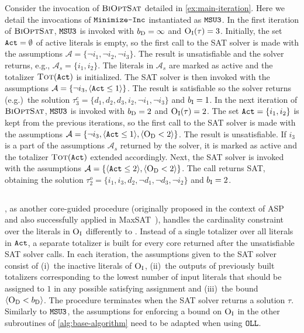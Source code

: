 \begin{example}\label{ex:msu}
Consider the invocation of $\textsc{BiOptSat}$ detailed in \cref{ex:main-iteration}. 
Here we detail the invocations of $\texttt{Minimize-\allowbreak{}Inc}$ instantiated as $\texttt{MSU3}$. 
In the first iteration of $\textsc{BiOptSat}$, $\texttt{MSU3}$ is invoked with $b_{\text{D}} =\infty$ and $\textsc{O}_{\text{I}}(\tau) = 3$.
Initially, the set $\texttt{Act} = \emptyset$ of active literals is empty, so the first call to the SAT solver is made with the assumptions 
$\mathcal{A} =  \{ \lnot i_1, \lnot i_2, \lnot i_3\}$. The result is unsatisfiable and the solver returns, e.g., $\mathcal{A}_s = \{i_1, i_2\}$. 
The literals in $\mathcal{A}_s$ are marked as active and the totalizer $\textsc{Tot}(\texttt{Act})$ is initialized.
The SAT solver is then invoked with the assumptions $\mathcal{A} = \{ \lnot i_3, \langle \texttt{Act} \leq 1 \rangle\}$. 
The result is satisfiable so the solver returns (e.g.)\ the solution $\tau^c_3 = \{ d_1,  d_2, d_3, i_2, \lnot i_1, \lnot i_3\}$ and $b_{\text{I}} = 1$.
In the next iteration of $\textsc{BiOptSat}$, $\texttt{MSU3}$ is invoked with $b_{\text{D}} = 2$ and $\textsc{O}_{\text{I}}(\tau) = 2$.
The set $\texttt{Act} = \{i_1, i_2\}$ is kept from the previous iterations, so the first call to the SAT solver is made with the assumptions  $\mathcal{A} = \{ \lnot i_3, \langle \texttt{Act} \leq 1 \rangle,  \langle \textsc{O}_{\text{D}} < 2 \rangle \}$.
The result is unsatisfiable. If $i_3$  is a part of the assumptions $\mathcal{A}_s$ returned by the solver, it is marked as active and the totalizer $\textsc{Tot}(\texttt{Act})$ extended accordingly. 
Next, the SAT solver is invoked with the assumptions $\mathcal{A} = \{\langle \texttt{Act} \leq 2 \rangle,  \langle \textsc{O}_{\text{D}} < 2 \rangle \}$. The call returns SAT, obtaining the solution $\tau^o_2 = \{ i_1, i_3, d_2, \lnot d_1, \lnot d_3, \lnot i_2\}$
and $b_{\text{I}} = 2$.
\end{example}

\subsection{\oll{}\label{sec:oll}}

\oll{}, as another
core-guided procedure (originally proposed in the context of ASP~\autocite{DBLP:conf/iclp/AndresKMS12} and also successfully applied in MaxSAT~\autocite{DBLP:conf/cp/MorgadoDM14,DBLP:journals/jsat/IgnatievMM19}),
handles the cardinality constraint over the literals in $\textsc{O}_{\text{I}}$ differently to \msu{}.
Instead of a single totalizer over all literals in $\texttt{Act}$, a separate totalizer is built for every core returned after the unsatisfiable SAT solver calls.
In each iteration, the assumptions given to the SAT solver consist of (i)~the inactive literals of $\textsc{O}_{\text{I}}$, (ii)~the outputs of previously built totalizers corresponding to the lowest number of input literals that should be assigned to $1$ in any possible satisfying assignment and (iii)~the bound $\langle \textsc{O}_{\text{D}} < b_{\text{D}} \rangle$.
The procedure terminates when the SAT solver returns a solution $\tau$.
Similarly to $\texttt{MSU3}$, the assumptions for enforcing a bound on $\textsc{O}_{\text{I}}$ in the other subroutines of \cref{alg:base-algorithm} need to be adapted when using $\texttt{OLL}$.

